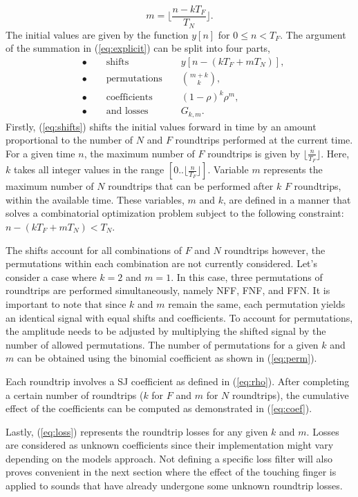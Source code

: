 \documentclass{sigchi}
\begin{document}
\begin{equation}
	m = \lfloor \frac{n - kT_F}{T_N} \rfloor.
\end{equation}
The initial values are given by the function $y[n]$ for $0 \leq n < T_F$. The argument of the summation in (\ref{eq:explicit}) can be split into four parts,
\begin{align}
	\label{eq:shifts}&\bullet\qquad\textrm{shifts }& &y[n - (kT_F + mT_N)], \\[1em]
	\label{eq:perm}&\bullet\qquad\textrm{permutations }& &\binom{m+k}{k}, \\[1em]
	\label{eq:coef}&\bullet\qquad\textrm{coefficients }& &(1 - \rho)^{k} \rho^m, \\[1em]
	\label{eq:loss}&\bullet\qquad\textrm{and losses }& &G_{k,m}.
\end{align}
Firstly, (\ref{eq:shifts}) shifts the initial values forward in time by an amount proportional to the number of $N$ and $F$ roundtrips performed at the current time. For a given time $n$, the maximum number of $F$ roundtrips is given by $\lfloor \frac{n}{T_F} \rfloor$. Here, $k$ takes all integer values in the range $[0..\lfloor \frac{n}{T_F} \rfloor]$. Variable $m$ represents the maximum number of $N$ roundtrips that can be performed after $k$ $F$ roundtrips, within the available time. These variables, $m$ and $k$, are defined in a manner that solves a combinatorial optimization problem subject to the following constraint: $n - (kT_F + mT_N) < T_N$.

The shifts account for all combinations of $F$ and $N$ roundtrips however, the permutations within each combination are not currently considered. Let's consider a case where $k = 2$ and $m = 1$. In this case, three permutations of roundtrips are performed simultaneously, namely NFF, FNF, and FFN. It is important to note that since $k$ and $m$ remain the same, each permutation yields an identical signal with equal shifts and coefficients. To account for permutations, the amplitude needs to be adjusted by multiplying the shifted signal by the number of allowed permutations. The number of permutations for a given $k$ and $m$ can be obtained using the binomial coefficient as shown in (\ref{eq:perm}).

Each roundtrip involves a SJ coefficient as defined in (\ref{eq:rho}). After completing a certain number of roundtrips ($k$ for $F$ and $m$ for $N$ roundtrips), the cumulative effect of the coefficients can be computed as demonstrated in (\ref{eq:coef}).

Lastly, (\ref{eq:loss}) represents the roundtrip losses for any given $k$ and $m$. Losses are considered as unknown coefficients since their implementation might vary depending on the models approach. Not defining a specific loss filter will also proves convenient in the next section where the effect of the touching finger is applied to sounds that have already undergone some unknown roundtrip losses.
\end{document}
